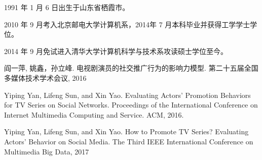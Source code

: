 \begin{resume}


  1991 年 1 月 6 日出生于山东省栖霞市。

  2010 年 9 月考入北京邮电大学计算机系，2014年 7 月本科毕业并获得工学学士学位。

  2014 年 9 月免试进入清华大学计算机科学与技术系攻读硕士学位至今。

  \begin{publications}
  \item 阎一萍, 姚鑫，孙立峰. 电视剧演员的社交推广行为的影响力模型. 第二十五届全国多媒体技术学术会议, 2016
  \item Yiping Yan, Lifeng Sun, and Xin Yao. Evaluating Actors' Promotion Behaviors for TV Series on Social Networks. Proceedings of the International Conference on Internet Multimedia Computing and Service. ACM, 2016.
  \item Yiping Yan, Lifeng Sun, and Xin Yao. How to Promote TV Series? Evaluating Actors’ Behavior on Social Media. The Third IEEE International Conference on Multimedia Big Data, 2017
  \end{publications}

\end{resume}
